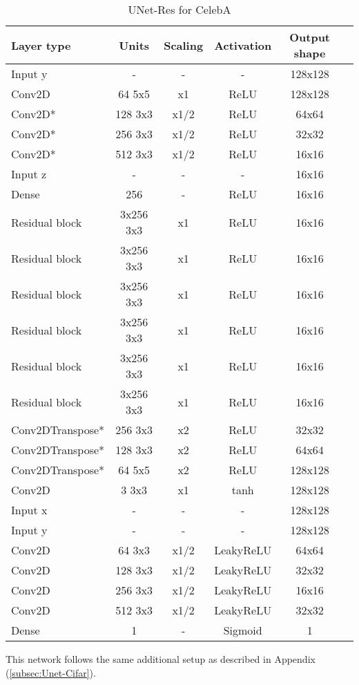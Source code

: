 \begin{table*}[!h]
	\centering
	\begin{tabular}{|l|c|c|c|c|c|}
		\hline
		Layer type & Units & Scaling & Activation & Output shape\\
		\hline
		Input y & - & - & - & 128x128\\
		Conv2D & 64 5x5 & x1 & ReLU & 128x128 \\
		Conv2D* & 128 3x3 & x1/2 & ReLU & 64x64 \\
		Conv2D* & 256 3x3 & x1/2 & ReLU & 32x32 \\
		Conv2D* & 512 3x3 & x1/2 & ReLU & 16x16 \\
		Input z & - & - & - & 16x16\\
		Dense & 256 & - & ReLU & 16x16\\
		Residual block & 3x256 3x3 & x1 & ReLU & 16x16 \\
		Residual block & 3x256 3x3 & x1 & ReLU & 16x16 \\
		Residual block & 3x256 3x3 & x1 & ReLU & 16x16 \\
		Residual block & 3x256 3x3 & x1 & ReLU & 16x16 \\
		Residual block & 3x256 3x3 & x1 & ReLU & 16x16 \\
		Residual block & 3x256 3x3 & x1 & ReLU & 16x16 \\
		Conv2DTranspose* & 256 3x3 & x2 & ReLU & 32x32 \\
		Conv2DTranspose* & 128 3x3 & x2 & ReLU & 64x64 \\
		Conv2DTranspose* & 64 5x5 & x2 & ReLU & 128x128 \\
		Conv2D & 3 3x3 & x1 & tanh & 128x128 \\
		\hline
		Input x & - & - & - & 128x128\\
		Input y & - & - & - & 128x128\\
		Conv2D & 64 3x3 & x1/2 & LeakyReLU & 64x64 \\
		Conv2D & 128 3x3 & x1/2 & LeakyReLU & 32x32 \\
		Conv2D & 256 3x3 & x1/2 & LeakyReLU & 16x16 \\
		Conv2D & 512 3x3 & x1/2 & LeakyReLU & 32x32 \\
		Dense & 1 & - & Sigmoid & 1\\
		\hline
	\end{tabular}
\label{subsec:unet_celeba}
\caption{UNet-Res for CelebA}
\end{table*}
\noindent
This network follows the same additional setup as described in Appendix (\ref{subsec:Unet-Cifar}).



